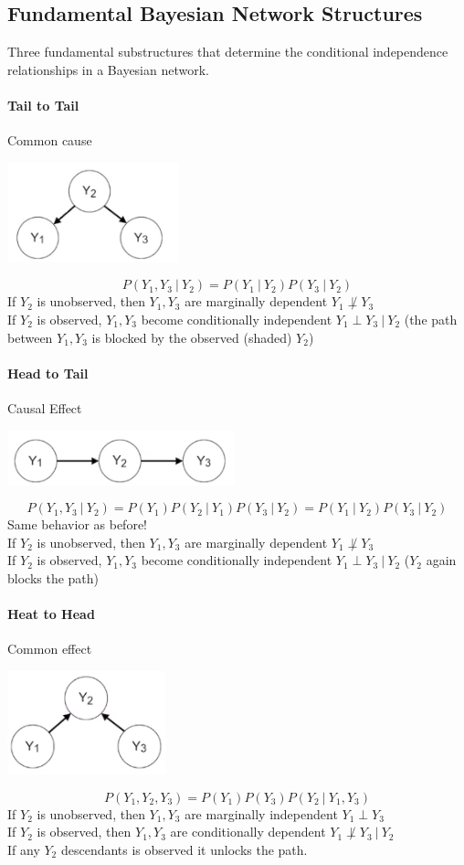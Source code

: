 \documentclass[10pt]{report}
\begin{document}
\subsection{Fundamental Bayesian Network Structures}
Three fundamental substructures that determine the conditional independence relationships in a Bayesian network.
\paragraph{Tail to Tail} Common cause \begin{center}
	\includegraphics[scale=0.75]{20.png}
\end{center}
$$P(Y_1,Y_3\:|\:Y_2)=P(Y_1\:|\:Y_2)P(Y_3\:|\:Y_2)$$
If $Y_2$ is unobserved, then $Y_1,Y_3$ are marginally dependent $Y_1\not\perp Y_3$\\
If $Y_2$ is observed, $Y_1,Y_3$ become conditionally independent $Y_1\perp Y_3\:|\:Y_2$ (the path between $Y_1,Y_3$ is blocked by the observed (shaded) $Y_2$)
\paragraph{Head to Tail} Causal Effect \begin{center}
	\includegraphics[scale=0.75]{21.png}
\end{center}
$$P(Y_1,Y_3\:|\:Y_2)=P(Y_1)P(Y_2\:|\:Y_1)P(Y_3\:|\:Y_2)=P(Y_1\:|\:Y_2)P(Y_3\:|\:Y_2)$$
Same behavior as before!\\
If $Y_2$ is unobserved, then $Y_1,Y_3$ are marginally dependent $Y_1\not\perp Y_3$\\
If $Y_2$ is observed, $Y_1,Y_3$ become conditionally independent $Y_1\perp Y_3\:|\:Y_2$ ($Y_2$ again blocks the path)
\paragraph{Heat to Head} Common effect\begin{center}
	\includegraphics[scale=0.75]{22.png}
\end{center}
$$P(Y_1,Y_2,Y_3) = P(Y_1)P(Y_3)P(Y_2\:|\:Y_1,Y_3)$$
If $Y_2$ is unobserved, then $Y_1,Y_3$ are marginally independent $Y_1\perp Y_3$\\
If $Y_2$ is observed, then $Y_1,Y_3$ are conditionally dependent $Y_1\not\perp Y_3\:|\:Y_2$\\
If any $Y_2$ descendants is observed it unlocks the path.
\end{document}
